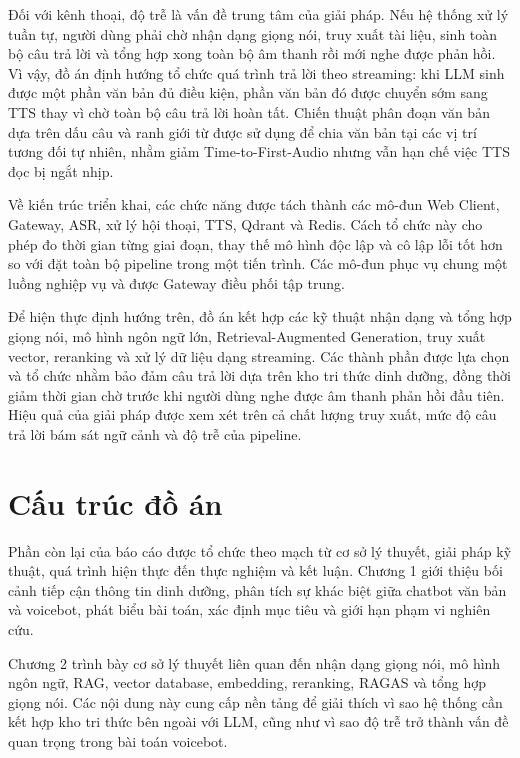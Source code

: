 \documentclass[a4paper,13pt,oneside]{report}
\begin{document}
Đối với kênh thoại, độ trễ là vấn đề trung tâm của giải pháp. Nếu hệ thống xử lý tuần tự, người dùng phải chờ nhận dạng giọng nói, truy xuất tài liệu, sinh toàn bộ câu trả lời và tổng hợp xong toàn bộ âm thanh rồi mới nghe được phản hồi. Vì vậy, đồ án định hướng tổ chức quá trình trả lời theo streaming: khi LLM sinh được một phần văn bản đủ điều kiện, phần văn bản đó được chuyển sớm sang TTS thay vì chờ toàn bộ câu trả lời hoàn tất. Chiến thuật phân đoạn văn bản dựa trên dấu câu và ranh giới từ được sử dụng để chia văn bản tại các vị trí tương đối tự nhiên, nhằm giảm Time-to-First-Audio nhưng vẫn hạn chế việc TTS đọc bị ngắt nhịp.

Về kiến trúc triển khai, các chức năng được tách thành các mô-đun Web Client, Gateway, ASR, xử lý hội thoại, TTS, Qdrant và Redis. Cách tổ chức này cho phép đo thời gian từng giai đoạn, thay thế mô hình độc lập và cô lập lỗi tốt hơn so với đặt toàn bộ pipeline trong một tiến trình. Các mô-đun phục vụ chung một luồng nghiệp vụ và được Gateway điều phối tập trung.

Để hiện thực định hướng trên, đồ án kết hợp các kỹ thuật nhận dạng và tổng hợp giọng nói, mô hình ngôn ngữ lớn, Retrieval-Augmented Generation, truy xuất vector, reranking và xử lý dữ liệu dạng streaming. Các thành phần được lựa chọn và tổ chức nhằm bảo đảm câu trả lời dựa trên kho tri thức dinh dưỡng, đồng thời giảm thời gian chờ trước khi người dùng nghe được âm thanh phản hồi đầu tiên. Hiệu quả của giải pháp được xem xét trên cả chất lượng truy xuất, mức độ câu trả lời bám sát ngữ cảnh và độ trễ của pipeline.

\section{Cấu trúc đồ án}

Phần còn lại của báo cáo được tổ chức theo mạch từ cơ sở lý thuyết, giải pháp kỹ thuật, quá trình hiện thực đến thực nghiệm và kết luận. Chương 1 giới thiệu bối cảnh tiếp cận thông tin dinh dưỡng, phân tích sự khác biệt giữa chatbot văn bản và voicebot, phát biểu bài toán, xác định mục tiêu và giới hạn phạm vi nghiên cứu.

Chương 2 trình bày cơ sở lý thuyết liên quan đến nhận dạng giọng nói, mô hình ngôn ngữ, RAG, vector database, embedding, reranking, RAGAS và tổng hợp giọng nói. Các nội dung này cung cấp nền tảng để giải thích vì sao hệ thống cần kết hợp kho tri thức bên ngoài với LLM, cũng như vì sao độ trễ trở thành vấn đề quan trọng trong bài toán voicebot.
\end{document}
